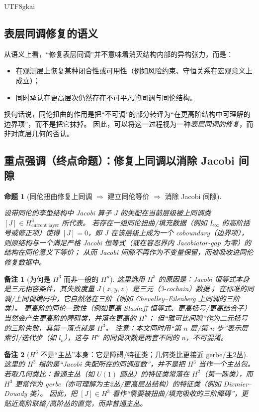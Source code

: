 \documentclass[12pt]{article}
\newtheorem{proposition}{命题}[section]
\newtheorem{remark}{备注}[section]
\begin{document}
\begin{CJK*}{UTF8}{gkai}
\subsection{表层同调修复的语义}

从语义上看，“修复表层同调”并不意味着消灭结构内部的异构张力，而是：
\begin{itemize}
  \item 在观测层上恢复某种闭合性或可用性（例如风险约束、守恒关系在宏观意义上成立）；
  \item 同时承认在更高层次仍然存在不可平凡的同调与同伦结构。
\end{itemize}

换句话说，同伦扭曲的作用是把“不可调”的部分转译为“在更高阶结构中可理解的边界项”，而不是把它抹掉。
因此，可以将这一过程视为一种\emph{表层同调的修复}，而非对底层几何的否认。

\subsection{重点强调（终点命题）：修复上同调以消除 Jacobi 间隙}

\begin{proposition}[同伦扭曲修复上同调 $\Rightarrow$ 建立同伦等价 $\Rightarrow$ 消除 Jacobi 间隙]\label{prop:homotopy-twist-kill-jacobi-gap}

设带同伦的李型结构中 Jacobi 算子 $J$ 的失配在当前层级被上同调类 $[J]\in H^3_{\text{current layer}}$ 所代表。
若存在一组同伦扭曲/填充数据（例如 $L_\infty$ 的高阶括号或修正项）使得 $[J]=0$，即 $J$ 在该层级上成为一个 coboundary（边界项），
则原结构与一个满足严格 Jacobi 恒等式（或在容忍界内 Jacobiator-gap 为零）的结构在同伦意义下等价；
从而 Jacobi 间隙不再作为不变量保留，而被吸收进同伦修复数据中。
\end{proposition}

\begin{remark}[为何是 $H^3$ 而非一般的 $H^n$]\label{rem:why-h3-not-hn}
这里选用 $H^3$ 的原因是：Jacobi 恒等式本身是\emph{三元}相容条件，其失败度量 $J(x,y,z)$ 是三元（3-cochain）数据；
在标准的同调/上同调编码中，它自然落在三阶（例如 Chevalley--Eilenberg 上同调的三阶类）。
更高阶的同伦一致性（例如更高 Stasheff 恒等式、更高括号/更高结合子）当然会产生更高阶的障碍类，并落在更高的 $H^n$；
但“雅可比间隙”作为\emph{二元括号的三阶失败}，其第一落点就是 $H^3$。
\emph{注意：}本文同时用“第 $n$ 层/第 $n$ 步”表示层索引/迭代步（如 $l_n$），这与 $H^n$ 的同调次数是两套不同的 $n$，不可混淆。
\end{remark}

\begin{remark}[$H^3$ 不是“主丛”本身：它是障碍/特征类；几何类比更接近 gerbe/主2丛]\label{rem:h3-gerbe-not-principal-bundle}
这里的 $H^3$ 指的是“Jacobi 失配所在的同调度数”，并不是把 $H^3$ 当作一个主丛包。
若取几何类比：普通主丛（如 $U(1)$ 圆丛）的特征类常落在 $H^2$（第一陈类），而 $H^3$ 更常作为 gerbe（亦可理解为主2丛/更高层丛结构）的特征类（例如 Dixmier--Douady 类）。
因此，把 $[J]\in H^3$ 看作“需要被扭曲/填充吸收的三阶障碍”，更贴近\emph{高阶联络/高阶丛}的直觉，而非普通主丛。
\end{remark}


\end{CJK*}
\end{document}
